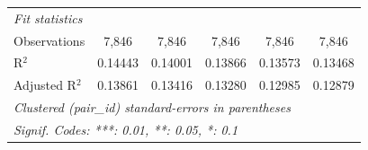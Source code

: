 \begin{tabular}{lccccc}
   \midrule
   \emph{Fit statistics}\\
   Observations    & 7,846          & 7,846          & 7,846          & 7,846          & 7,846\\  
   R$^2$           & 0.14443        & 0.14001        & 0.13866        & 0.13573        & 0.13468\\  
   Adjusted R$^2$  & 0.13861        & 0.13416        & 0.13280        & 0.12985        & 0.12879\\  
   \midrule \midrule
   \multicolumn{6}{l}{\emph{Clustered (pair\_id) standard-errors in parentheses}}\\
   \multicolumn{6}{l}{\emph{Signif. Codes: ***: 0.01, **: 0.05, *: 0.1}}\\
\end{tabular}
\par\endgroup


